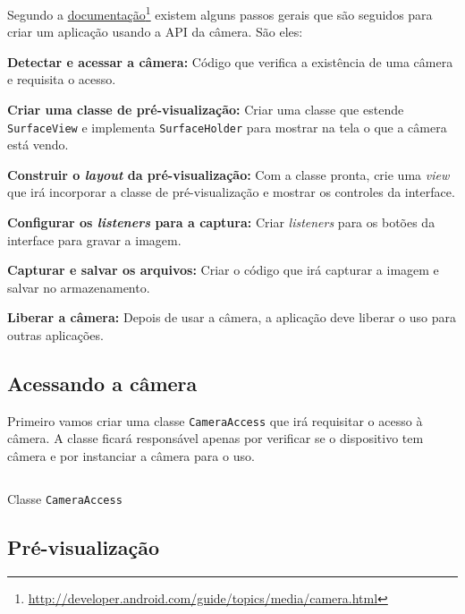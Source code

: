 \documentclass[a4paper,12pt,brazil,oneside]{book}
\begin{document}
\begin{singlespace}
		Segundo a \href{http://developer.android.com/guide/topics/media/camera.html}{documentação}\footnote{\href{http://developer.android.com/guide/topics/media/camera.html}{http://developer.android.com/guide/topics/media/camera.html}} existem alguns passos gerais que são seguidos para criar um aplicação usando a API da câmera. São eles:
		\bi
			\item \textbf{Detectar e acessar a câmera:} Código que verifica a existência de uma câmera e requisita o acesso.
			\item \textbf{Criar uma classe de pré-visualização:} Criar uma classe que estende \texttt{SurfaceView} e implementa \texttt{SurfaceHolder} para mostrar na tela o que a câmera está vendo.
			\item \textbf{Construir o \emph{layout} da pré-visualização:} Com a classe pronta, crie uma \emph{view} que irá incorporar a classe de pré-visualização e mostrar os controles da interface.
			\item \textbf{Configurar os \emph{listeners} para a captura:} Criar \emph{listeners} para os botões da interface para gravar a imagem.
			\item \textbf{Capturar e salvar os arquivos:} Criar o código que irá capturar a imagem e salvar no armazenamento.
			\item \textbf{Liberar a câmera:} Depois de usar a câmera, a aplicação deve liberar o uso para outras aplicações. 
		\ei

		\subsection{Acessando a câmera}

		Primeiro vamos criar uma classe \texttt{CameraAccess} que irá requisitar o acesso à câmera. 
		A classe ficará responsável apenas por verificar se o dispositivo tem câmera e por instanciar a câmera para o uso. 

		\begin{listing}[H]
		\inputminted[linenos=true,fontsize=\small,frame=lines, framesep=2mm, tabsize=2,numbersep=5pt]{java}{src/api/camera/camera-access.java}
		\caption{Classe \texttt{CameraAccess}}
		\label{code:camera-access}
		\end{listing} 	

		\subsection{Pré-visualização}


\end{singlespace}
\end{document}

